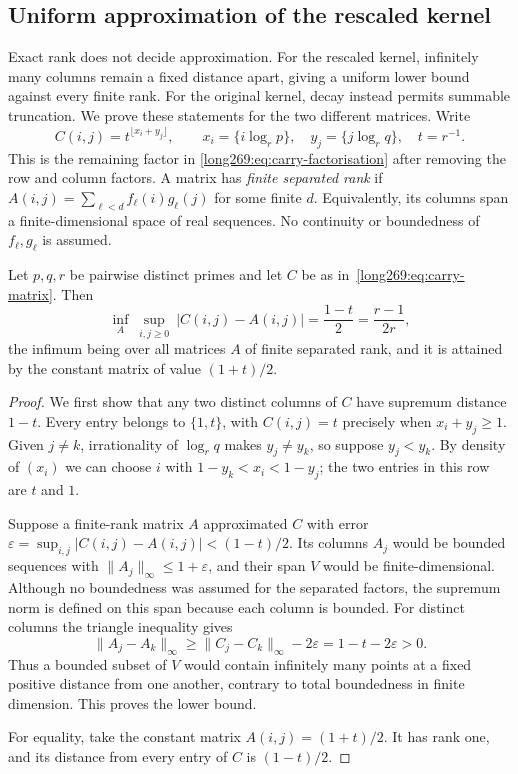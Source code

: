 \documentclass[11pt]{article}
\theoremstyle{remark}
\theoremstyle{plain}
\begin{document}
\subsection{Uniform approximation of the rescaled kernel}\label{long269:sec:approximation}

Exact rank does not decide approximation. For the rescaled kernel,
infinitely many columns remain a fixed distance apart, giving a uniform
lower bound against every finite rank. For the original kernel, decay
instead permits summable truncation. We prove these statements for the
two different matrices. Write
\begin{equation}\label{long269:eq:carry-matrix}
 C(i,j)=t^{\lfloor x_i+y_j\rfloor},\qquad
 x_i=\{i\log_r p\},\quad y_j=\{j\log_r q\},\quad t=r^{-1}.
\end{equation}
This is the remaining factor in
\eqref{long269:eq:carry-factorisation} after removing the row and column
factors. A matrix has \emph{finite separated rank} if
$A(i,j)=\sum_{\ell<d}f_\ell(i)g_\ell(j)$ for some finite $d$.
Equivalently, its columns span a finite-dimensional space of real
sequences. No continuity or boundedness of $f_\ell,g_\ell$ is assumed.

\begin{theorem}\label{long269:res:uniform-rank}
Let $p,q,r$ be pairwise distinct primes and let $C$ be as
in~\eqref{long269:eq:carry-matrix}.  Then
\[
 \inf_{A}\ \sup_{i,j\ge0}\ |C(i,j)-A(i,j)|=\frac{1-t}{2}=\frac{r-1}{2r},
\]
the infimum being over all matrices $A$ of finite separated rank, and it is
attained by the constant matrix of value $(1+t)/2$.
\end{theorem}

\begin{proof}
We first show that any two distinct columns of $C$ have supremum distance
$1-t$. Every entry belongs to $\{1,t\}$, with $C(i,j)=t$ precisely when
$x_i+y_j\ge1$. Given $j\ne k$, irrationality of $\log_r q$ makes
$y_j\ne y_k$, so suppose $y_j<y_k$. By density of $(x_i)$ we can choose
$i$ with $1-y_k<x_i<1-y_j$; the two entries in this row are $t$ and $1$.

Suppose a finite-rank matrix $A$ approximated $C$ with error
$\varepsilon=\sup_{i,j}|C(i,j)-A(i,j)|<(1-t)/2$. Its columns $A_j$ would
be bounded sequences with $\|A_j\|_\infty\le1+\varepsilon$, and their
span $V$ would be finite-dimensional. Although no boundedness was assumed
for the separated factors, the supremum norm is defined on this span
because each column is bounded. For distinct columns the triangle
inequality gives
\[
 \|A_j-A_k\|_\infty\ge\|C_j-C_k\|_\infty-2\varepsilon
 =1-t-2\varepsilon>0.
\]
Thus a bounded subset of $V$ would contain infinitely many points at a
fixed positive distance from one another, contrary to total boundedness
in finite dimension. This proves the lower bound.

For equality, take the constant matrix $A(i,j)=(1+t)/2$. It has rank one,
and its distance from every entry of $C$ is $(1-t)/2$.
\end{proof}
\end{document}
